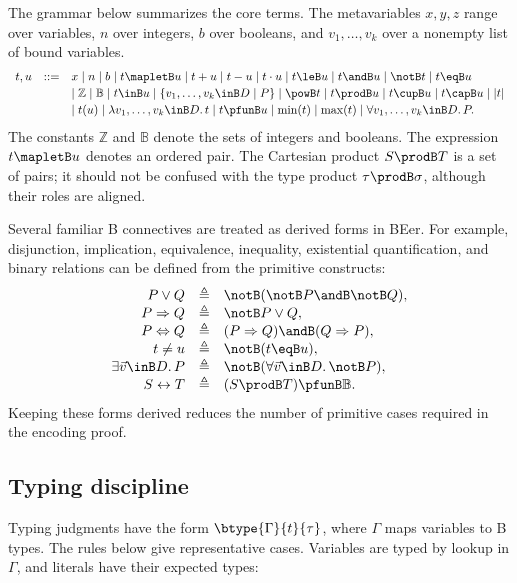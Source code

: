 The grammar below summarizes the core terms.
The metavariables \(x,y,z\) range over variables, \(n\) over integers, \(b\) over booleans, and \(v_1,\ldots,v_k\) over a nonempty list of bound variables.
\[
\begin{array}{rcl}
t,u &::=& x
  \mid n
  \mid b
  \mid t \mapletB u
  \mid t + u
  \mid t - u
  \mid t \cdot u
  \mid t \leB u
  \mid t \andB u
  \mid \notB t
  \mid t \eqB u
  \\[0.2em]
&& \mid \mathbb{Z}
  \mid \mathbb{B}
  \mid t \inB u
  \mid \{v_1,\ldots,v_k \inB D \mid P\}
  \mid \powB t
  \mid t \prodB u
  \mid t \cupB u
  \mid t \capB u
  \mid |t|
  \\[0.2em]
&& \mid t(u)
  \mid \lambda v_1,\ldots,v_k \inB D.\,t
  \mid t \pfunB u
  \mid \min(t)
  \mid \max(t)
  \mid \forall v_1,\ldots,v_k \inB D.\,P.
\end{array}
\]
The constants \(\mathbb{Z}\) and \(\mathbb{B}\) denote the sets of integers and booleans.
The expression \(t \mapletB u\) denotes an ordered pair.
The Cartesian product \(S \prodB T\) is a set of pairs; it should not be confused with the type product \(\tau \prodB \sigma\), although their roles are aligned.

Several familiar B connectives are treated as derived forms in BEer.
For example, disjunction, implication, equivalence, inequality, existential quantification, and binary relations can be defined from the primitive constructs:
\[
\begin{array}{rcl}
P \lor Q &\triangleq& \notB(\notB P \andB \notB Q),\\
P \Rightarrow Q &\triangleq& \notB P \lor Q,\\
P \Leftrightarrow Q &\triangleq& (P \Rightarrow Q) \andB (Q \Rightarrow P),\\
t \neq u &\triangleq& \notB(t \eqB u),\\
\exists \vec v \inB D.\,P &\triangleq& \notB(\forall \vec v \inB D.\,\notB P),\\
S \leftrightarrow T &\triangleq& (S \prodB T) \pfunB \mathbb{B}.
\end{array}
\]
Keeping these forms derived reduces the number of primitive cases required in the encoding proof.

\subsection{Typing discipline}

Typing judgments have the form \(\btype{\Gamma}{t}{\tau}\), where \(\Gamma\) maps variables to B types.
The rules below give representative cases.
Variables are typed by lookup in \(\Gamma\), and literals have their expected types:

